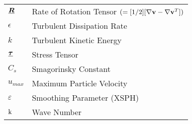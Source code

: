\begin{longtable}{ll}
$\underline{\bm{R}}$                   & Rate of Rotation Tensor $(=[1/2][\nabla \mathbf{v} - \nabla \mathbf{v}^T])$     \\
$\epsilon$                     & Turbulent Dissipation Rate                                                  \\
$k$                            & Turbulent Kinetic Energy                                                    \\
$\underline{\bm{\tau}}$                & Stress Tensor                                                               \\
$C_s $                         & Smagorinsky Constant                                                        \\
$u_{max}$                      & Maximum Particle Velocity                                                   \\
$\varepsilon$                  & Smoothing Parameter (XSPH)                                                  \\
$\mathrm{k}$                  & Wave Number                                                                
\end{longtable}